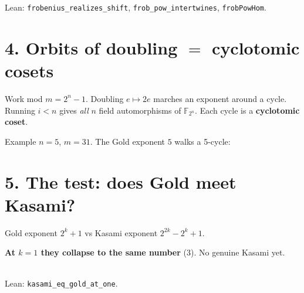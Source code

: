 \documentclass[11pt]{article}
\begin{document}
\begin{center}\small
Lean: \texttt{frobenius\_realizes\_shift}, \texttt{frob\_pow\_intertwines},
\texttt{frobPowHom}.
\end{center}

\section*{4. Orbits of doubling $=$ cyclotomic cosets}

Work mod $m=2^{n}-1$. Doubling $e\mapsto 2e$ marches an exponent around a
cycle. Running $i<n$ gives \emph{all} $n$ field automorphisms of
$\mathbb{F}_{2^{n}}$. Each cycle is a \textbf{cyclotomic coset}.

Example $n=5$, $m=31$. The Gold exponent $5$ walks a 5-cycle:

\begin{center}
\end{center}

\section*{5. The test: does Gold meet Kasami?}

Gold exponent $2^{k}+1$ \quad vs \quad Kasami exponent $2^{2k}-2^{k}+1$.

\textbf{At $k=1$ they collapse to the same number} ($3$). No genuine Kasami
yet.

\begin{center}
\\[2pt]
{\small Lean: \texttt{kasami\_eq\_gold\_at\_one}.}
\end{center}
\end{document}
